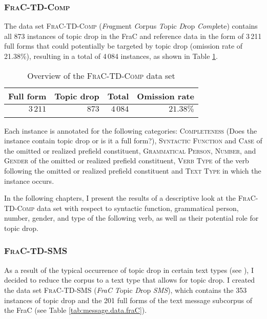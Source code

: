 \subsubsection{\textsc{FraC-TD-Comp}}\label{sec:corpus.comp}
The data set \textsc{FraC-TD-Comp} (\textit{Fra}gment \textit{C}orpus \textit{T}opic \textit{D}rop \textit{Comp}lete) contains all 873 instances of topic drop in the FraC and reference data in the form of  3\,211 full forms that could potentially be targeted by topic drop (omission rate of 21.38\%), resulting in a total of 4\,084 instances, as shown in Table \ref{tab:complete.data.fraC}.

\begin{table}
\centering
\caption{Overview of the \textsc{FraC-TD-Comp} data set}
\begin{tabular}{rrrr}
\lsptoprule
Full form & Topic drop & Total & Omission rate \\
\midrule
$3\,211$ & $873$ & $4\,084$ & $21.38\%$\\
\lspbottomrule
\end{tabular}
\label{tab:complete.data.fraC}
\end{table}

\noindent
Each instance is annotated for the following categories:
\textsc{Completeness} (Does the instance contain topic drop or is it a full form?), 
\textsc{Syntactic Function} and \textsc{Case} of the omitted or realized prefield constituent, \textsc{Grammatical Person, Number}, and \textsc{Gender} of the omitted or realized prefield constituent, \textsc{Verb Type} of the verb following the omitted or realized prefield constituent and \textsc{Text Type} in which the instance occurs.

In the following chapters, I present the results of a descriptive look at the \textsc{FraC-TD-Comp} data set with respect to syntactic function, grammatical person, number, gender, and type of the following verb, as well as their potential role for topic drop.

\subsubsection{\textsc{FraC-TD-SMS}}\label{sec:corpus.mess}
As a result of the typical occurrence of topic drop in certain text types (see ), I decided to reduce the corpus to a text type that allows for topic drop.
I created the data set \textsc{FraC-TD-SMS} (\textit{FraC} \textit{T}opic \textit{D}rop \textit{SMS}), which contains the 353 instances of topic drop and the 201 full forms of the text message subcorpus of the FraC (see Table \ref{tab:message.data.fraC}).

